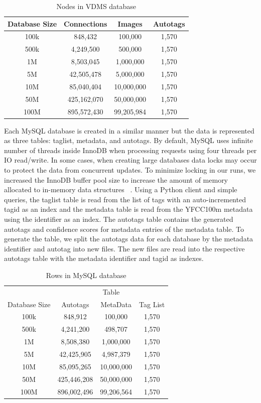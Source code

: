 \begin{table}[h]
\caption{Nodes in VDMS database}
\centering
\begin{tabular}{c c c c}
\hline\hline
Database Size & Connections & Images & Autotags\\
\hline
100k & 848,432      & 100,000     & 1,570\\
500k & 4,249,500    & 500,000     & 1,570\\
1M   & 8,503,045    & 1,000,000   & 1,570\\
5M   & 42,505,478   & 5,000,000   & 1,570\\
10M  & 85,040,404   & 10,000,000  & 1,570\\
50M  & 425,162,070  & 50,000,000  & 1,570\\
100M & 895,572,430  & 99,205,984  & 1,570\\
\hline
\end{tabular}
\label{table:vdmsnodes}
\end{table}

Each MySQL database is created in a similar manner but the data is represented
as three tables: taglist, metadata, and autotags.
By default, MySQL uses infinite number of threads inside InnoDB when processing
requests using four threads per IO read/write.
In some cases, when creating large databases data locks may occur to protect the
data from concurrent updates.
To minimize locking in our runs, we increased the InnoDB buffer pool size to
increase the amount of memory allocated to in-memory data structures
~\cite{mysql,mysql_blog}.
Using a Python client and simple queries, the taglist table is read from the
list of tags with an auto-incremented tagid as an index and the metadata table
is read from the YFCC100m metadata using the identifier as an index.
The autotags table contains the generated autotags and confidence scores for
metadata entries of the metadata table.
To generate the table, we split the autotags data for each database by the
metadata identifier and autotag into new files.
The new files are read into the respective autotags table with the metadata
identifier and tagid as indexes.

\begin{table}[h]
\caption{Rows in MySQL database}
\centering
\begin{tabular}{c c c c}
\hline\hline
 & \multicolumn{3}{c}{Table}\\
\cline{2-4}
Database Size & Autotags & MetaData & Tag List\\
\hline
100k & 848,912     & 100,000    & 1,570\\
500k & 4,241,200   & 498,707    & 1,570\\
1M   & 8,508,380   & 1,000,000  & 1,570\\
5M   & 42,425,905  & 4,987,379  & 1,570\\
10M  & 85,095,265  & 10,000,000 & 1,570\\
50M  & 425,446,208 & 50,000,000 & 1,570\\
100M & 896,002,496 & 99,206,564 & 1,570\\
\hline
\end{tabular}
\label{table:mysqltables}
\end{table}

